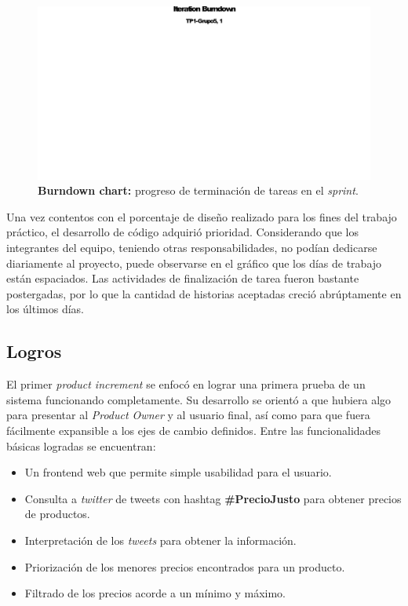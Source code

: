 \documentclass[10pt, a4paper]{article}
\begin{document}
\begin{figure}[H]
\centering
\includegraphics[width=\textwidth]{graphics/iteration_burndown.pdf}
\caption{\textbf{Burndown chart:} progreso de terminación de tareas en el \emph{sprint}.}
\end{figure}

Una vez contentos con el porcentaje de diseño realizado para los fines del trabajo práctico, el desarrollo de código adquirió prioridad. Considerando que los integrantes del equipo, teniendo otras responsabilidades, no podían dedicarse diariamente al proyecto, puede observarse en el gráfico que los días de trabajo están espaciados. Las actividades de finalización de tarea fueron bastante postergadas, por lo que la cantidad de historias aceptadas creció abrúptamente en los últimos días.

\subsection{Logros}

El primer \emph{product increment} se enfocó en lograr una primera prueba de un sistema funcionando completamente. Su desarrollo se orientó a que hubiera algo para presentar al \emph{Product Owner} y al usuario final, así como para que fuera fácilmente expansible a los ejes de cambio definidos. Entre las funcionalidades básicas logradas se encuentran:

\begin{itemize}
  \item Un frontend web que permite simple usabilidad para el usuario.
  \item Consulta a \emph{twitter} de tweets con hashtag \textbf{\#PrecioJusto} para obtener precios de productos.
  \item Interpretación de los \emph{tweets} para obtener la información.
  \item Priorización de los menores precios encontrados para un producto.
  \item Filtrado de los precios acorde a un mínimo y máximo.
\end{itemize}
\end{document}
